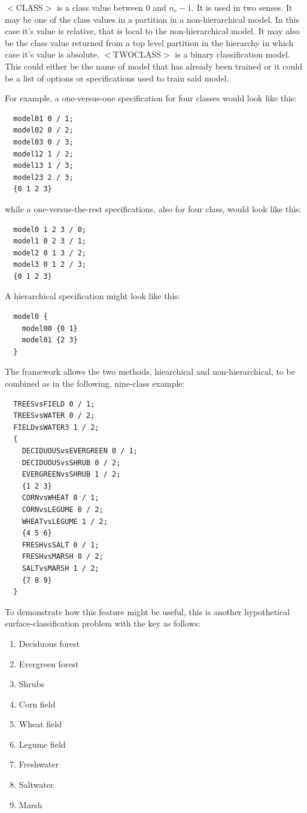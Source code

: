 \documentclass{article}
\begin{document}
$<$CLASS$>$ is a class value between 0 and $n_c-1$.  It is used in two senses.
It may be one of the class values in a partition in a non-hierarchical model.
In this case it's value is relative, that is local to the non-hierarchical model.
It may also be the class value returned
from a top level partition in the hierarchy in which case it's value is absolute.
$<$TWOCLASS$>$ is a binary classification model.
This could either be the name of model that has already been trained or it
could be a list of options or specifications used to train said model.

For example, a one-versus-one specification for four classes would look like
this:

\begin{verbatim}
  model01 0 / 1;
  model02 0 / 2;
  model03 0 / 3;
  model12 1 / 2;
  model13 1 / 3;
  model23 2 / 3;
  {0 1 2 3}
\end{verbatim}

while a one-versus-the-rest specifications, also for four class, would look
like this:

\begin{verbatim}
  model0 1 2 3 / 0;
  model1 0 2 3 / 1;
  model2 0 1 3 / 2;
  model3 0 1 2 / 3;
  {0 1 2 3}
\end{verbatim}

A hierarchical specification might look like this:

\begin{verbatim}
  model0 {
    model00 {0 1}
    model01 {2 3}
  }
\end{verbatim}

The framework allows the two methods,
 hiearchical and non-hierarchical, 
to be combined
as in the following, nine-class example:

\begin{verbatim}
  TREESvsFIELD 0 / 1;
  TREESvsWATER 0 / 2;
  FIELDvsWATER3 1 / 2;
  {
    DECIDUOUSvsEVERGREEN 0 / 1;
    DECIDUOUSvsSHRUB 0 / 2;
    EVERGREENvsSHRUB 1 / 2;
    {1 2 3}
    CORNvsWHEAT 0 / 1;
    CORNvsLEGUME 0 / 2;
    WHEATvsLEGUME 1 / 2;
    {4 5 6}
    FRESHvsSALT 0 / 1;
    FRESHvsMARSH 0 / 2;
    SALTvsMARSH 1 / 2;
    {7 8 9}
  }
\end{verbatim}

To demonstrate how this feature might be useful, this is another hypothetical 
surface-classification problem with the key as follows:
\begin{enumerate}
	\item Deciduous forest
	\item Evergreen forest
	\item Shrubs
	\item Corn field
	\item Wheat field
	\item Legume field
	\item Freshwater
	\item Saltwater
	\item Marsh
\end{enumerate}
\end{document}
